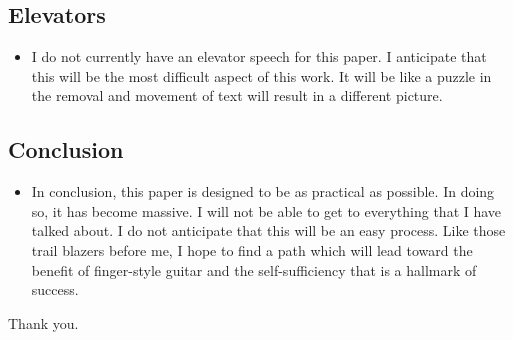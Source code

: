 \documentclass[11pt]{article}
\begin{document}
\subsection{Elevators}
\label{sec-1-5}
\begin{itemize}
\item I do not currently have an elevator speech for this paper. I anticipate
that this will be the most difficult aspect of this work. It will be like a
puzzle in the removal and movement of text will result in a different
picture.
\end{itemize}

\subsection{Conclusion}
\label{sec-1-6}
\begin{itemize}
\item In conclusion, this paper is designed to be as practical as possible. In
doing so, it has become massive. I will not be able to get to everything
that I have talked about. I do not anticipate that this will be an easy
process. Like those trail blazers before me, I hope to find a path which
will lead toward the benefit of finger-style guitar and the
self-sufficiency that is a hallmark of success.
\end{itemize}

Thank you.
\end{document}
